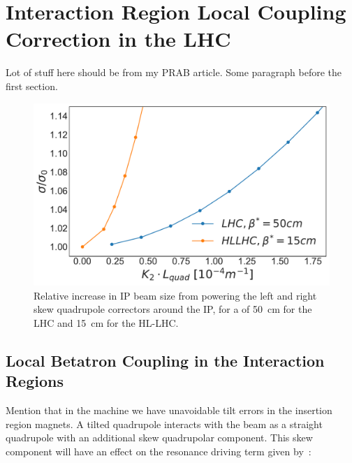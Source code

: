 \chapter{Interaction Region Local Coupling Correction in the LHC} %

\label{Chapter:IR_Local_Coupling} %

Lot of stuff here should be from my PRAB article.
Some paragraph before the first section.

\begin{figure}
    \centering
    \includegraphics*[width=0.9\linewidth]{Figures/Chapter4/lhc_vs_hllhc_ratios_normalised.pdf}
    \caption{Relative increase in IP beam size from powering the left and right skew quadrupole correctors around the IP, for a \betastar of \qty{50}{\centi\metre} for the LHC and \qty{15}{\centi\meter} for the HL-LHC.}
    \label{figure:lhc_vs_hllhc_ratios}
\end{figure}


\section{Local Betatron Coupling in the Interaction Regions}

Mention that in the machine we have unavoidable tilt errors in the insertion region magnets.
A tilted quadrupole interacts with the beam as a straight quadrupole with an additional skew quadrupolar component.
This skew component will have an effect on the \foneohone resonance driving term given by~\cite{PRAB:Calaga:Coupling_Merging_Hamiltonian_Matrix_Approaches}:

